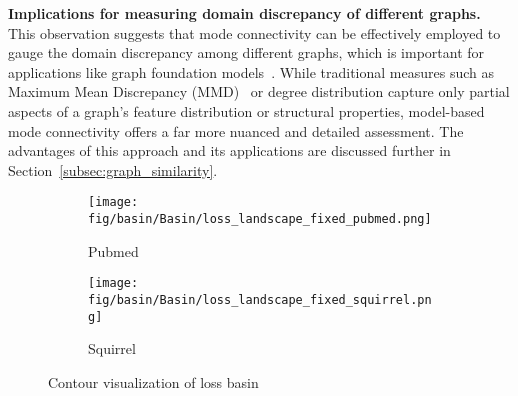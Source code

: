 
\textbf{Implications for measuring domain discrepancy of different graphs.} This observation suggests that mode connectivity can be effectively employed to gauge the domain discrepancy among different graphs, which is important for applications like graph foundation models~\citep{chen2024textspace, maoposition}. While traditional measures such as Maximum Mean Discrepancy (MMD)~\citep{JMLR:v13:gretton12a} or degree distribution capture only partial aspects of a graph's feature distribution or structural properties, model-based mode connectivity offers a far more nuanced and detailed assessment. The advantages of this approach and its applications are discussed further in Section~\ref{subsec:graph_similarity}. 



\begin{figure}[ht]
    \centering
    \begin{subfigure}[b]{0.23\textwidth}
        \centering
        \texttt{[image: fig/basin/Basin/loss\_landscape\_fixed\_pubmed.png]}
        \caption{Pubmed}
    \end{subfigure}
    \begin{subfigure}[b]{0.23\textwidth}
        \centering
        \texttt{[image: fig/basin/Basin/loss\_landscape\_fixed\_squirrel.png]}
        \caption{Squirrel}
    \end{subfigure}
    \vspace{-0.1in}
    \caption{Contour visualization of loss basin} 
    \vspace{-0.2in}
    \label{fig:contour}
    \end{figure}

